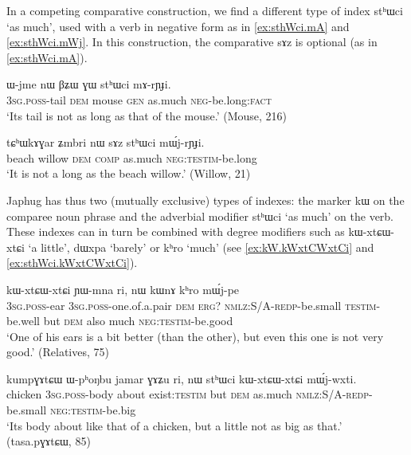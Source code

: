 \documentclass[oldfontcommands,oneside,a4paper,11pt]{article}
\newcommand{\ipa}[1]{{\phon #1}} %
\begin{document}
In a competing comparative construction, we find a different type of index   \ipa{stʰɯci} `as much', used with a verb in negative form as in \ref{ex:sthWci.mA} and \ref{ex:sthWci.mWj}. In this construction, the comparative \ipa{sɤz} is optional (as in \ref{ex:sthWci.mA}).
 
 
 \begin{exe}
\ex \label{ex:sthWci.mA}
\gll 
\ipa{ɯ-jme}  	\ipa{nɯ}  	\ipa{βʑɯ}  	\ipa{ɣɯ}  	\ipa{stʰɯci}  	\ipa{mɤ-rɲɟi.}  \\
\textsc{3sg.poss}-tail \textsc{dem} mouse \textsc{gen} as.much \textsc{neg}-be.long:\textsc{fact} \\
\glt `Its tail is not as long as that of the mouse.'  (Mouse, 216)
 \end{exe}
 
  \begin{exe}
\ex \label{ex:sthWci.mWj}
\gll 
 \ipa{tɕʰɯkɤɣar}  	\ipa{ʑmbri}  	\ipa{nɯ}  	\ipa{sɤz}  	\ipa{stʰɯci}  	\ipa{mɯ́j-rɲɟi.}  \\
beach willow \textsc{dem} \textsc{comp} as.much \textsc{neg:testim}-be.long \\
\glt `It is not a long as the beach willow.' (Willow, 21)
  \end{exe}
  
Japhug has thus two (mutually exclusive) types of indexes: the   marker   \ipa{kɯ}  on the comparee noun phrase and the adverbial modifier \ipa{stʰɯci} `as much' on the verb. These indexes can in turn be combined with degree modifiers such as \ipa{kɯ-xtɕɯ-xtɕi} `a little', \ipa{dɯxpa} `barely' or \ipa{kʰro} `much' (see \ref{ex:kW.kWxtCWxtCi} and \ref{ex:sthWci.kWxtCWxtCi}).
  
    \begin{exe}
\ex \label{ex:kW.kWxtCWxtCi}
\gll 
  [\ipa{ɯ-rna}  	\ipa{ɯ-ntsi}  	\ipa{nɯ}]  	\ipa{kɯ}  	\ipa{kɯ-xtɕɯ-xtɕi}  	\ipa{ɲɯ-mna}  	\ipa{ri,}  	\ipa{nɯ}  	\ipa{kɯnɤ}  	\ipa{kʰro}  	\ipa{mɯ́j-pe}  \\
  \textsc{3sg.poss}-ear \textsc{3sg.poss}-one.of.a.pair \textsc{dem} \textsc{erg?} \textsc{nmlz:S/A-redp}-be.small \textsc{testim}-be.well but \textsc{dem} also much \textsc{neg:testim}-be.good \\
  \glt `One of his ears is a bit better (than the other), but even this one is not very good.' (Relatives, 75)
  \end{exe}
 
     \begin{exe}
\ex \label{ex:sthWci.kWxtCWxtCi}
\gll 
  \ipa{kumpɣɤtɕɯ}  	\ipa{ɯ-pʰoŋbu}  	\ipa{jamar}  	\ipa{ɣɤʑu}  	\ipa{ri,}  	\ipa{nɯ}  	\ipa{stʰɯci}  	\ipa{kɯ-xtɕɯ-xtɕi}  	\ipa{mɯ́j-wxti.}  \\
  chicken \textsc{3sg.poss}-body about exist:\textsc{testim} but \textsc{dem} as.much \textsc{nmlz:S/A-redp}-be.small \textsc{neg:testim}-be.big \\
\glt `Its body about like that of a chicken, but a little not as big as that.' (\ipa{tasa.pɣɤtɕɯ}, 85)
  \end{exe}
\end{document}
